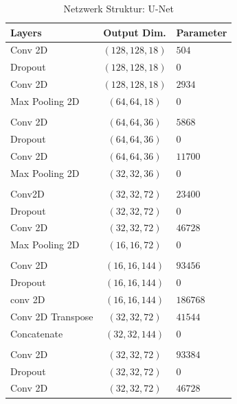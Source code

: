 \begin{table}
    \centering
    \caption{Netzwerk Struktur: U-Net}
    \label{tab:structure}
    \begin{tabular}{l c l}
        \toprule
        Layers & Output Dim. & Parameter \\
        \midrule
        Conv 2D                 & $(128, 128, 18)$ & $504$ \\       
        Dropout               & $(128, 128, 18)$ & $0  $ \\       
        Conv 2D               & $(128, 128, 18)$ & $2934  $ \\       
        Max Pooling 2D    & $(64, 64, 18)  $ & $0  $ \\       
        & & \\ 
        Conv 2D               & $(64, 64, 36)  $ & $5868  $ \\       
        Dropout             & $(64, 64, 36)  $ & $0  $ \\       
        Conv 2D               & $(64, 64, 36)  $ & $11700 $ \\       
        Max Pooling 2D  & $(32, 32, 36)  $ & $0  $ \\       
        & & \\ 
        Conv2D               & $(32, 32, 72)  $ & $23400 $ \\       
        Dropout             & $(32, 32, 72)  $ & $0  $ \\       
        Conv 2D               & $(32, 32, 72)  $ & $46728 $ \\       
        Max Pooling 2D  & $(16, 16, 72)  $ & $0  $ \\       
        & & \\ 
        Conv 2D               & $(16, 16, 144) $ & $93456 $ \\       
        Dropout             & $(16, 16, 144) $ & $0  $ \\       
        conv 2D               & $(16, 16, 144) $ & $186768$ \\       
        Conv 2D Transpose & $(32, 32, 72)  $ & $41544 $ \\       
        Concatenate       & $(32, 32, 144) $ & $0  $ \\
        & & \\             
        Conv 2D               & $(32, 32, 72)  $ & $93384 $ \\       
        Dropout             & $(32, 32, 72)  $ & $0  $ \\       
        Conv 2D               & $(32, 32, 72)  $ & $46728 $ \\       

\end{tabular}
\end{table}
